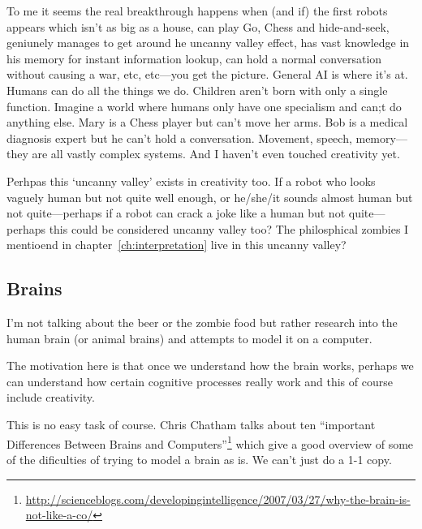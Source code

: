 To me it seems the real breakthrough happens when (and if) the first robots appears which isn't as big as a house, can play Go, Chess and hide-and-seek, geniunely manages to get around he uncanny valley effect, has vast knowledge in his memory for instant information lookup, can hold a normal conversation without causing a war, etc, etc---you get the picture. General \ac{AI} is where it's at. Humans can do all the things we do. Children aren't born with only a single function. Imagine a world where humans only have one specialism and can;t do anything else. Mary is a Chess player but can't move her arms. Bob is a medical diagnosis expert but he can't hold a conversation. Movement, speech, memory---they are all vastly complex systems. And I haven't even touched creativity yet.

Perhpas this `uncanny valley' exists in creativity too. If a robot who looks vaguely human but not quite well enough, or he/she/it sounds almost human but not quite---perhaps if a robot can crack a joke like a human but not quite---perhaps this could be considered uncanny valley too? The philosphical zombies I mentioend in chapter~\ref{ch:interpretation} live in this uncanny valley?



\subsection{Brains}

I'm not talking about the beer or the zombie food but rather research into the human brain (or animal brains) and attempts to model it on a computer. 

The motivation here is that once we understand how the brain works, perhaps we can understand how certain cognitive processes really work and this of course include creativity.

This is no easy task of course. Chris Chatham talks about ten ``important Differences Between Brains and Computers''\footnote{\url{http://scienceblogs.com/developingintelligence/2007/03/27/why-the-brain-is-not-like-a-co/}} which give a good overview of some of the dificulties of trying to model a brain as is. We can't just do a 1-1 copy.

